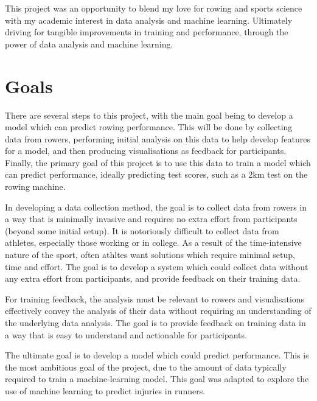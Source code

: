 This project was an opportunity to blend my love for rowing and sports science with my academic interest in data analysis and machine learning.  Ultimately driving for tangible improvements in training and performance, through the power of data analysis and machine learning.


\section{Goals}
There are several steps to this project, with the main goal being to develop a model which can predict rowing performance. This will be done by collecting data from rowers, performing initial analysis on this data to help develop features for a model, and then producing visualisations as feedback for participants. Finally, the primary goal of this project is to use this data to train a model which can predict performance, ideally predicting test scores, such as a 2km test on the rowing machine.

In developing a data collection method, the goal is to collect data from rowers in a way that is minimally invasive and requires no extra effort from participants (beyond some initial setup). It is notoriously difficult to collect data from athletes, especially those working or in college. As a result of the time-intensive nature of the sport, often athltes want solutions which require minimal setup, time and effort. The goal is to develop a system which could collect data without any extra effort from participants, and provide feedback on their training data.

For training feedback, the analysis must be relevant to rowers and visualisations effectively convey the analysis of their data without requiring an understanding of the underlying data analysis. The goal is to provide feedback on training data in a way that is easy to understand and actionable for participants.

The ultimate goal is to develop a model which could predict performance. This is the most ambitious goal of the project, due to the amount of data typically required to train a machine-learning model. This goal was adapted to explore the use of machine learning to predict injuries in runners.

